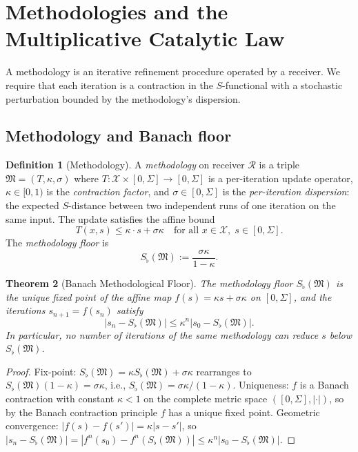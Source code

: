 \documentclass[11pt,twocolumn,a4paper]{article}
\newtheorem{theorem}{Theorem}[section]
\theoremstyle{definition}
\newtheorem{definition}[theorem]{Definition}
\theoremstyle{remark}
\newcommand{\Cands}{\mathcal{X}}
\newcommand{\Method}{\mathfrak{M}}
\newcommand{\receiver}{\mathcal{R}}
\newcommand{\Sigmax}{\Sigma}
\newcommand{\Sscalar}{S}
\newcommand{\Sfloor}{S_{\flat}}
\newcommand{\catpow}{\kappa}
\newcommand{\disp}{\sigma}
\begin{document}
\section{Methodologies and the Multiplicative Catalytic Law}
\label{sec:methodologies}

A methodology is an iterative refinement procedure operated by a receiver. We require that each iteration is a contraction in the $\Sscalar$-functional with a stochastic perturbation bounded by the methodology's dispersion.

\subsection{Methodology and Banach floor}

\begin{definition}[Methodology]
\label{def:method}
A \emph{methodology} on receiver $\receiver$ is a triple $\Method = (T, \catpow, \disp)$ where $T : \Cands \times [0, \Sigmax] \to [0, \Sigmax]$ is a per-iteration update operator, $\catpow \in [0, 1)$ is the \emph{contraction factor}, and $\disp \in [0, \Sigmax]$ is the \emph{per-iteration dispersion}: the expected $\Sscalar$-distance between two independent runs of one iteration on the same input. The update satisfies the affine bound
\[
T(x, s) \leq \catpow \cdot s + \disp\catpow \quad \text{for all } x \in \Cands,\; s \in [0, \Sigmax].
\]
The \emph{methodology floor} is
\[
\Sfloor(\Method) := \frac{\disp\catpow}{1 - \catpow}.
\]
\end{definition}

\begin{theorem}[Banach Methodological Floor]
\label{thm:method-floor}
The methodology floor $\Sfloor(\Method)$ is the unique fixed point of the affine map $f(s) = \catpow s + \disp\catpow$ on $[0, \Sigmax]$, and the iterations $s_{n+1} = f(s_n)$ satisfy
\[
\big|s_n - \Sfloor(\Method)\big| \leq \catpow^n \big|s_0 - \Sfloor(\Method)\big|.
\]
In particular, no number of iterations of the same methodology can reduce $s$ below $\Sfloor(\Method)$.
\end{theorem}

\begin{proof}
Fix-point: $\Sfloor(\Method) = \catpow \Sfloor(\Method) + \disp\catpow$ rearranges to $\Sfloor(\Method)(1 - \catpow) = \disp\catpow$, i.e., $\Sfloor(\Method) = \disp\catpow/(1-\catpow)$. Uniqueness: $f$ is a Banach contraction with constant $\catpow < 1$ on the complete metric space $([0,\Sigmax], |\cdot|)$, so by the Banach contraction principle \citep{banach1922operations} $f$ has a unique fixed point. Geometric convergence: $|f(s) - f(s')| = \catpow |s - s'|$, so $|s_n - \Sfloor(\Method)| = |f^n(s_0) - f^n(\Sfloor(\Method))| \leq \catpow^n |s_0 - \Sfloor(\Method)|$.
\end{proof}
\end{document}
